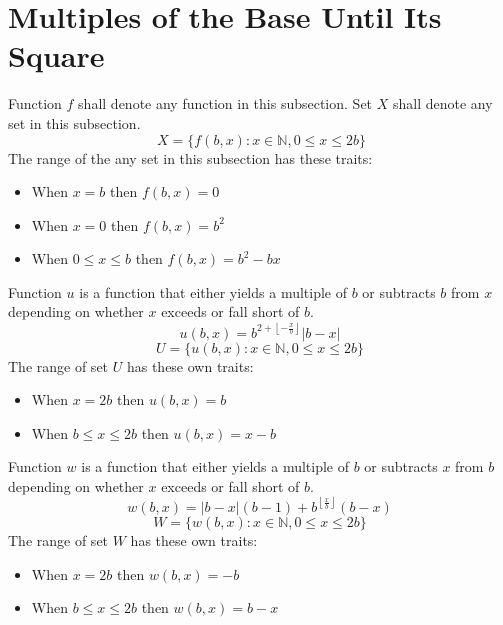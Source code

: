 \documentclass[letterpaper, twoside,12pt]{book}
\begin{document}
    \section{Multiples of the Base Until Its Square} \label{u_and_w}
    Function $f$ shall denote any function in this subsection. Set $X$ shall denote any set in this subsection.
    \begin{equation}\
            X = \{ f(b,x) : x \in \mathbb{N}, 0 \leq x \leq 2b \}
    \end{equation}
    The range of the any set in this subsection has these traits:
    \begin{itemize}
        \item When $x = b$ then $f(b,x) = 0$
        \item When $x = 0$ then $f(b,x) = b^2$
        \item When $0 \leq x \leq b$ then $f(b,x) = b^2 - bx$
    \end{itemize}
    Function $u$ is a function that either yields a multiple of $b$ or subtracts $b$ from $x$ depending on whether $x$ exceeds or fall short of $b$.
    \begin{equation}
        u(b,x) = b^{2 + \left\lfloor -\frac{x}{b} \right\rfloor }|b-x|
    \end{equation}
    \begin{equation}
        U = \{ u(b,x) : x \in \mathbb{N}, 0 \leq x \leq 2b \}
    \end{equation}
    The range of set $U$ has these own traits:
    \begin{itemize}
        \item When $x = 2b$ then $u(b,x) = b$
        \item When $b \leq x \leq 2b$ then $u(b,x) = x - b$
    \end{itemize}

    Function $w$ is a function that either yields a multiple of $b$ or subtracts $x$ from $b$ depending on whether $x$ exceeds or fall short of $b$.
    \begin{equation}
        w(b,x) = |b-x|(b-1) + b^{\left\lfloor \frac{x}{b} \right\rfloor}(b-x)
    \end{equation}
    \begin{equation}
        W = \{ w(b,x) : x \in \mathbb{N}, 0 \leq x \leq 2b \}
    \end{equation}
    The range of set $W$ has these own traits:
    \begin{itemize}
        \item When $x = 2b$ then $w(b,x) = -b$
        \item When $b \leq x \leq 2b$ then $w(b,x) = b - x$
    \end{itemize}
\end{document}
